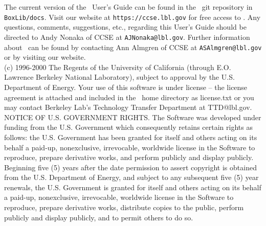 \noindent The current version of the \BoxLib\ User's Guide can be found in 
the \BoxLib\ git repository in {\tt BoxLib/docs}.  Visit our website
at {\tt https://ccse.lbl.gov} for free access to \BoxLib.  Any questions,
comments, suggestions, etc., regarding this User's Guide should be directed
to Andy Nonaka of CCSE at {\tt AJNonaka@lbl.gov}.  Further information 
about \BoxLib\ can be found by contacting Ann Almgren of CCSE at 
{\tt ASAlmgren@lbl.gov} or by visiting our website.\\

\noindent (c) 1996-2000 The Regents of the University of California (through
E.O. Lawrence Berkeley National Laboratory), subject to approval by
the U.S. Department of Energy.  Your use of this software is under
license -- the license agreement is attached and included in the
\BoxLib\ home directory as license.txt or you may contact Berkeley Lab's Technology
Transfer Department at TTD@lbl.gov.  NOTICE OF U.S. GOVERNMENT RIGHTS.
The Software was developed under funding from the U.S. Government
which consequently retains certain rights as follows: the
U.S. Government has been granted for itself and others acting on its
behalf a paid-up, nonexclusive, irrevocable, worldwide license in the
Software to reproduce, prepare derivative works, and perform publicly
and display publicly.  Beginning five (5) years after the date
permission to assert copyright is obtained from the U.S. Department of
Energy, and subject to any subsequent five (5) year renewals, the
U.S. Government is granted for itself and others acting on its behalf
a paid-up, nonexclusive, irrevocable, worldwide license in the
Software to reproduce, prepare derivative works, distribute copies to
the public, perform publicly and display publicly, and to permit
others to do so.\\

